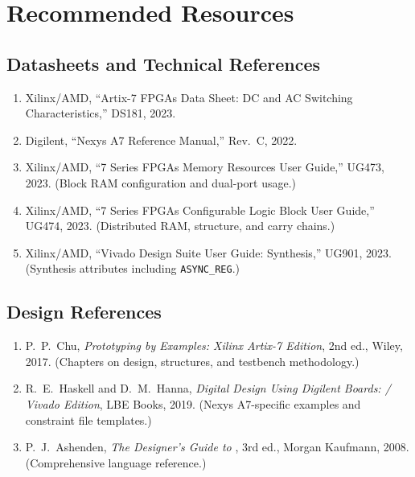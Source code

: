 \documentclass[11pt,letterpaper]{article}
\begin{document}
	\newpage
	\section{Recommended Resources}

	\subsection{Datasheets and Technical References}

	\begin{enumerate}[leftmargin=2em]
		\item Xilinx/AMD, ``Artix-7 FPGAs Data Sheet: DC and AC Switching Characteristics,'' DS181, 2023.
		\item Digilent, ``Nexys A7 Reference Manual,'' Rev.\ C, 2022.
		\item Xilinx/AMD, ``7 Series FPGAs Memory Resources User Guide,'' UG473, 2023. (Block RAM configuration and dual-port usage.)
		\item Xilinx/AMD, ``7 Series FPGAs Configurable Logic Block User Guide,'' UG474, 2023. (Distributed RAM, \LUT{} structure, and carry chains.)
		\item Xilinx/AMD, ``Vivado Design Suite User Guide: Synthesis,'' UG901, 2023. (Synthesis attributes including \texttt{ASYNC\_REG}.)
	\end{enumerate}

	\subsection{\VHDL{} Design References}

	\begin{enumerate}[leftmargin=2em]
		\item P.\ P.\ Chu, \textit{\FPGA{} Prototyping by \VHDL{} Examples: Xilinx Artix-7 Edition}, 2nd ed., Wiley, 2017. (Chapters on \UART{} design, \FIFO{} structures, and testbench methodology.)
		\item R.\ E.\ Haskell and D.\ M.\ Hanna, \textit{Digital Design Using Digilent \FPGA{} Boards: \VHDL{} / Vivado Edition}, LBE Books, 2019. (Nexys A7-specific examples and constraint file templates.)
		\item P.\ J.\ Ashenden, \textit{The Designer's Guide to \VHDL{}}, 3rd ed., Morgan Kaufmann, 2008. (Comprehensive \VHDL{} language reference.)
	\end{enumerate}
\end{document}
